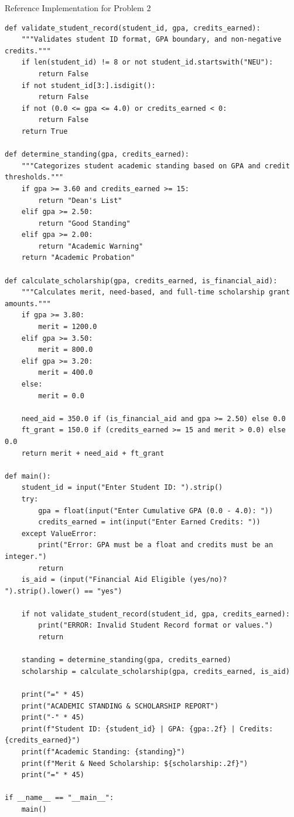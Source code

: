 \documentclass[11pt,a4paper]{article}
\begin{document}
\begin{solbox}{Reference Implementation for Problem 2}
\begin{lstlisting}
def validate_student_record(student_id, gpa, credits_earned):
    """Validates student ID format, GPA boundary, and non-negative credits."""
    if len(student_id) != 8 or not student_id.startswith("NEU"):
        return False
    if not student_id[3:].isdigit():
        return False
    if not (0.0 <= gpa <= 4.0) or credits_earned < 0:
        return False
    return True

def determine_standing(gpa, credits_earned):
    """Categorizes student academic standing based on GPA and credit thresholds."""
    if gpa >= 3.60 and credits_earned >= 15:
        return "Dean's List"
    elif gpa >= 2.50:
        return "Good Standing"
    elif gpa >= 2.00:
        return "Academic Warning"
    return "Academic Probation"

def calculate_scholarship(gpa, credits_earned, is_financial_aid):
    """Calculates merit, need-based, and full-time scholarship grant amounts."""
    if gpa >= 3.80:
        merit = 1200.0
    elif gpa >= 3.50:
        merit = 800.0
    elif gpa >= 3.20:
        merit = 400.0
    else:
        merit = 0.0

    need_aid = 350.0 if (is_financial_aid and gpa >= 2.50) else 0.0
    ft_grant = 150.0 if (credits_earned >= 15 and merit > 0.0) else 0.0
    return merit + need_aid + ft_grant

def main():
    student_id = input("Enter Student ID: ").strip()
    try:
        gpa = float(input("Enter Cumulative GPA (0.0 - 4.0): "))
        credits_earned = int(input("Enter Earned Credits: "))
    except ValueError:
        print("Error: GPA must be a float and credits must be an integer.")
        return
    is_aid = (input("Financial Aid Eligible (yes/no)? ").strip().lower() == "yes")

    if not validate_student_record(student_id, gpa, credits_earned):
        print("ERROR: Invalid Student Record format or values.")
        return

    standing = determine_standing(gpa, credits_earned)
    scholarship = calculate_scholarship(gpa, credits_earned, is_aid)

    print("=" * 45)
    print("ACADEMIC STANDING & SCHOLARSHIP REPORT")
    print("-" * 45)
    print(f"Student ID: {student_id} | GPA: {gpa:.2f} | Credits: {credits_earned}")
    print(f"Academic Standing: {standing}")
    print(f"Merit & Need Scholarship: ${scholarship:.2f}")
    print("=" * 45)

if __name__ == "__main__":
    main()
\end{lstlisting}
\end{solbox}
\end{document}
